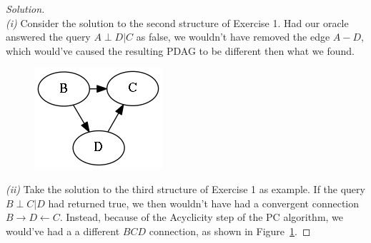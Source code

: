 \documentclass{amsart}
\theoremstyle{plain}
\newenvironment{solution}{\begin{proof}[Solution]}{\end{proof}}
\begin{document}
\begin{solution}~\\

  \textit{(i)} Consider the solution to the second structure of Exercise 1. Had our oracle answered
  the query $A\perp D|C$ as false, we wouldn't have removed the edge $A-D$, which would've caused
  the resulting PDAG to be different then what we found.

  \begin{figure}[h]
    \centering\includegraphics[scale=0.45]{graphs/ex2.png}
    \caption{}\label{ex2}
  \end{figure}


  \textit{(ii)} Take the solution to the third structure of Exercise 1 as example. If the query
  $B\perp C|D$ had returned true, we then wouldn't have had a convergent connection $B\to D
  \gets C$. Instead, because of the Acyclicity step of the PC algorithm, we would've had a
  a different $BCD$ connection, as shown in Figure~\ref{ex2}.
\end{solution}

\newpage

\printbibliography[]
\end{document}
